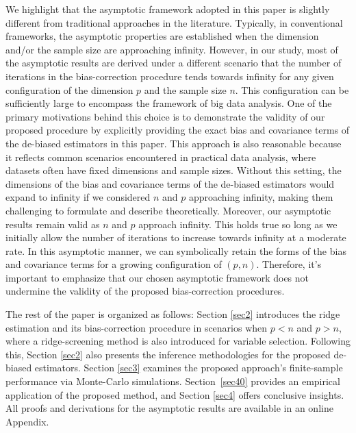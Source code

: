 We highlight that the asymptotic framework adopted in this paper is slightly different from traditional approaches in the literature. Typically, in conventional frameworks, the asymptotic properties are established when the dimension and/or the sample size are approaching infinity. However, in our study, most of the asymptotic results are derived under a different scenario that the number of iterations in the bias-correction procedure tends towards infinity for any given configuration of the dimension $p$ and the sample size $n$. This configuration can be sufficiently large to encompass the framework of big data analysis. One of the primary motivations behind this choice is to demonstrate the validity of our proposed procedure by explicitly providing the exact bias and covariance terms of the de-biased estimators in this paper. This approach is also reasonable because it reflects common scenarios encountered in practical data analysis, where datasets often have fixed dimensions and sample sizes.  Without this setting, the dimensions of the bias and covariance terms of the de-biased estimators would expand to infinity if we considered $n$ and $p$ approaching infinity, making them challenging to formulate and describe theoretically. Moreover, our asymptotic results remain valid as $n$ and $p$ approach infinity. This holds true so long as we initially allow the number of iterations to increase towards infinity at a moderate rate. In this asymptotic manner, we can symbolically retain the forms of the bias and covariance terms for a growing configuration of $(p, n)$. Therefore, it's important to emphasize that our chosen asymptotic framework does not undermine the validity of the proposed bias-correction procedures.


The rest of the paper is organized as follows: Section \ref{sec2} introduces the ridge estimation and its bias-correction procedure in scenarios when $p< n$ and $p>n$, where a ridge-screening method is also introduced for variable selection.  Following this, Section \ref{sec2} also presents the inference methodologies for the proposed de-biased estimators. Section \ref{sec3} examines the proposed approach's finite-sample performance via Monte-Carlo simulations. Section~\ref{sec40} provides an empirical application of the proposed method, and Section \ref{sec4}  offers conclusive insights. All proofs and derivations for the asymptotic results are available in an online Appendix.



